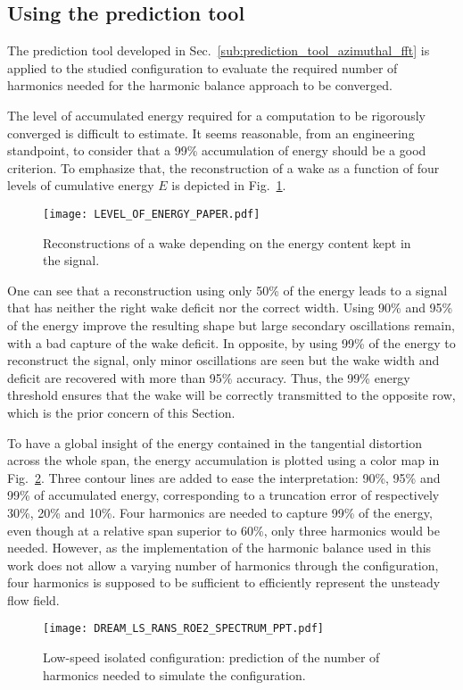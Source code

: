 
\subsection{Using the prediction tool}
\label{sub:dream_ls_conv_hb_prediction_tool}

The prediction tool developed in 
Sec.~\ref{sub:prediction_tool_azimuthal_fft} is applied
to the studied configuration to evaluate the
required number of harmonics needed for the
harmonic balance approach to be converged.

The level of accumulated energy required 
for a computation to be rigorously converged
is difficult to estimate. 
It seems reasonable, from an engineering standpoint, to consider
that a 99\% accumulation of energy should be a good criterion.
To emphasize that,
the reconstruction of a wake as a function of four levels of cumulative
energy $E$ is depicted in Fig.~\ref{fig:level_of_energy}. 
\begin{figure}[htp]
  \centering
  \texttt{[image: LEVEL\_OF\_ENERGY\_PAPER.pdf]}
  \caption{Reconstructions of a wake depending on
  the energy content kept in the signal.}
  \label{fig:level_of_energy}
\end{figure}
One can see
that a reconstruction using only 50\% of the energy
leads to a signal that has neither
the right wake deficit nor the correct width. Using
90\% and 95\% of the energy improve the resulting shape
but  large secondary
oscillations remain, with a bad capture
of the wake deficit.
In opposite, by using 99\% of the energy to reconstruct
the signal, only minor
oscillations are seen but 
the wake width and deficit are recovered with more than 
95\% accuracy.
Thus, the 99\% energy threshold ensures that the wake
will be correctly transmitted to the opposite row, which is
the prior concern of this Section.

To have a global insight of the energy contained in the
tangential distortion across the whole span,
the energy accumulation is plotted using a color map
in Fig.~\ref{fig:DREAM_LS_RANS_ROE2_SPECTRUM_PPT}.
Three contour lines are added to ease the
interpretation: 90\%, 95\%
and 99\% of accumulated energy, corresponding to a truncation
error of respectively 30\%, 20\% and 10\%.
Four harmonics are needed to capture 99\% of the energy, even though
at a relative span superior to 60\%, only three harmonics would be needed.
However, as the implementation of the harmonic balance used
in this work does not allow a varying number of harmonics through the
configuration, four harmonics is supposed to be sufficient to efficiently 
represent the unsteady flow field.
\begin{figure}[htp]
  \centering
  \texttt{[image: DREAM\_LS\_RANS\_ROE2\_SPECTRUM\_PPT.pdf]}
  \caption{Low-speed isolated configuration: prediction of the number
  of harmonics needed to simulate the configuration.}
  \label{fig:DREAM_LS_RANS_ROE2_SPECTRUM_PPT}
\end{figure}

